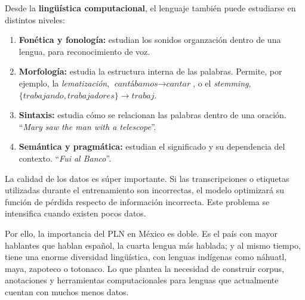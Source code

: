 \documentclass[11pt,a4paper]{article}
\begin{document}
Desde la \textbf{lingüística computacional}, el lenguaje también puede estudiarse
en distintos niveles:

\begin{enumerate}[label=\arabic*., leftmargin=*]
    \item \textbf{Fonética y fonología:} estudian los sonidos organzación dentro de una lengua, para reconocimiento de voz.
    \item \textbf{Morfología:} estudia la estructura interna de las palabras.
    Permite, por ejemplo, la \textit{lematización},
    $\textit{cantábamos}\rightarrow\textit{cantar}$, o el \textit{stemming},
    $\{\textit{trabajando},\textit{trabajadores}\}\rightarrow\textit{trabaj}$.
    \item \textbf{Sintaxis:} estudia cómo se relacionan las palabras dentro de una
    oración. ``\textit{Mary saw the man with a telescope}''.
    \item \textbf{Semántica y pragmática:} estudian el significado y su dependencia
    del contexto. ``\textit{Fui al Banco}''.
\end{enumerate}

La calidad de los datos es súper importante. Si las transcripciones o
etiquetas utilizadas durante el entrenamiento son incorrectas, el modelo
optimizará su función de pérdida respecto de información incorrecta.
Este problema se intensifica cuando existen pocos datos. 

Por ello, la importancia del PLN en México es doble. Es el país con mayor hablantes que hablan español, la cuarta lengua más hablada; y al mismo tiempo, tiene una enorme  
diversidad lingüística, con lenguas indígenas como náhuatl, maya,
zapoteco o totonaco. Lo que  
plantea la necesidad de construir corpus,
anotaciones y herramientas computacionales para lenguas que actualmente cuentan
con muchos menos datos.

\printbibliography[title={Referencias}]
\end{document}
